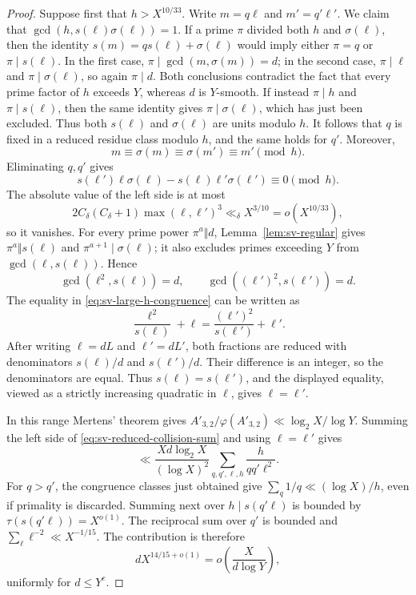 \documentclass[11pt]{article}
\theoremstyle{remark}
\newcommand{\1}{\mathbf 1}
\begin{document}
\begin{proof}
Suppose first that $h>X^{10/33}$.  Write $m=q\ell$ and $m'=q'\ell'$.  We claim that
$\gcd(h,s(\ell)\sigma(\ell))=1$.  If a prime $\pi$ divided both $h$
and $\sigma(\ell)$, then the identity
$s(m)=q s(\ell)+\sigma(\ell)$ would imply either $\pi=q$ or
$\pi\mid s(\ell)$.  In the first case,
$\pi\mid\gcd(m,\sigma(m))=d$; in the second case,
$\pi\mid\ell$ and $\pi\mid\sigma(\ell)$, so again $\pi\mid d$.
Both conclusions contradict the fact that every prime factor of $h$ exceeds
$Y$, whereas $d$ is $Y$-smooth.  If instead $\pi\mid h$ and
$\pi\mid s(\ell)$, then the same identity gives
$\pi\mid\sigma(\ell)$, which has just been excluded.  Thus both
$s(\ell)$ and $\sigma(\ell)$ are units modulo $h$.  It follows that
$q$ is fixed in a reduced residue class modulo $h$, and the same holds for
$q'$.  Moreover,
\[
 m\equiv\sigma(m)\equiv\sigma(m')\equiv m'\pmod h.
\]
Eliminating $q,q'$ gives
\begin{equation}\label{eq:sv-large-h-congruence}
 s(\ell')\ell\sigma(\ell)-s(\ell)\ell'\sigma(\ell')
 \equiv0\pmod h.
\end{equation}
The absolute value of the left side is at most
\[
 2C_\delta(C_\delta+1)\max(\ell,\ell')^3
 \ll_\delta X^{3/10}=o(X^{10/33}),
\]
so it vanishes.  For every prime power $\pi^a\Vert d$,
Lemma~\ref{lem:sv-regular} gives
$\pi^a\Vert s(\ell)$ and $\pi^{a+1}\mid\sigma(\ell)$; it also excludes
primes exceeding $Y$ from $\gcd(\ell,s(\ell))$.  Hence
\[
 \gcd(\ell^2,s(\ell))=d,
 \qquad
 \gcd((\ell')^2,s(\ell'))=d.
\]
The equality in \eqref{eq:sv-large-h-congruence} can be written as
\[
 \frac{\ell^2}{s(\ell)}+\ell
 =\frac{(\ell')^2}{s(\ell')}+\ell'.
\]
After writing $\ell=dL$ and $\ell'=dL'$, both fractions are reduced with
denominators $s(\ell)/d$ and $s(\ell')/d$.  Their difference is an integer,
so the denominators are equal.  Thus $s(\ell)=s(\ell')$, and the displayed
equality, viewed as a strictly increasing quadratic in $\ell$, gives
$\ell=\ell'$.

In this range Mertens' theorem gives
$A'_{3,2}/\varphi(A'_{3,2})\ll\log_2X/\log Y$.  Summing the left side of
\eqref{eq:sv-reduced-collision-sum} and using $\ell=\ell'$ gives
\[
 \ll\frac{Xd\log_2X}{(\log X)^2}
 \sum_{q,q',\ell,h}\frac{h}{qq'\ell^2}.
\]
For $q>q'$, the congruence classes just obtained give
$\sum_q1/q\ll(\log X)/h$, even if primality is discarded.  Summing next
over $h\mid s(q'\ell)$ is bounded by
$\tau(s(q'\ell))=X^{o(1)}$.  The reciprocal sum over $q'$ is bounded and
$\sum_\ell\ell^{-2}\ll X^{-1/15}$.  The contribution is therefore
\[
 dX^{14/15+o(1)}=o\!\left(\frac{X}{d\log Y}\right),
\]
uniformly for $d\leq Y^c$.


\end{proof}
\end{document}

